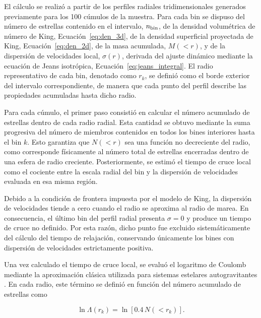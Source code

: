         El cálculo se realizó a partir de los perfiles radiales tridimensionales 
        generados previamente para los 100 cúmulos de la muestra. Para cada bin 
        se dispuso del número de estrellas contenido en el intervalo, 
        $n_{{\rm bin}}$, de la densidad volumétrica de número de King, 
        Ecuación~\eqref{eq:den_3d}, de la densidad superficial proyectada de 
        King, Ecuación~\eqref{eq:den_2d}, de la masa acumulada, $M(<r)$, y de la 
        dispersión de velocidades local, $\sigma(r)$, derivada del ajuste 
        dinámico mediante la ecuación de Jeans isotrópica, 
        Ecuación~\eqref{eq:jeans_integral}. El radio representativo de cada bin, 
        denotado como $r_k$, se definió como el borde exterior del intervalo 
        correspondiente, de manera que cada punto del perfil describe las 
        propiedades acumuladas hasta dicho radio.

        Para cada cúmulo, el primer paso consistió en calcular el número 
        acumulado de estrellas dentro de cada radio radial. Esta cantidad se 
        obtuvo mediante la suma progresiva del número de miembros contenidos en 
        todos los bines interiores hasta el bin $k$. Esto garantiza que $N(<r)$ 
        sea una función no decreciente del radio, como corresponde físicamente 
        al número total de estrellas encerradas dentro de una esfera de radio 
        creciente. Posteriormente, se estimó el tiempo de cruce local como el 
        cociente entre la escala radial del bin y la dispersión de velocidades 
        evaluada en esa misma región.

        Debido a la condición de frontera impuesta por el modelo de King, la 
        dispersión de velocidades tiende a cero cuando el radio se aproxima al 
        radio de marea. En consecuencia, el último bin del perfil radial 
        presenta $\sigma = 0$ y produce un tiempo de cruce no definido. Por esta 
        razón, dicho punto fue excluido sistemáticamente del cálculo del tiempo 
        de relajación, conservando únicamente los bines con dispersión de 
        velocidades estrictamente positiva.

        Una vez calculado el tiempo de cruce local, se evaluó el logaritmo de 
        Coulomb mediante la aproximación clásica utilizada para sistemas 
        estelares autogravitantes \cite{Spitzer1987}. En cada radio, este 
        término se definió en función del número acumulado de estrellas como

        \begin{equation*}
            \ln \Lambda(r_k) = \ln \left[0.4\,N(<r_k)\right].
        \end{equation*}

